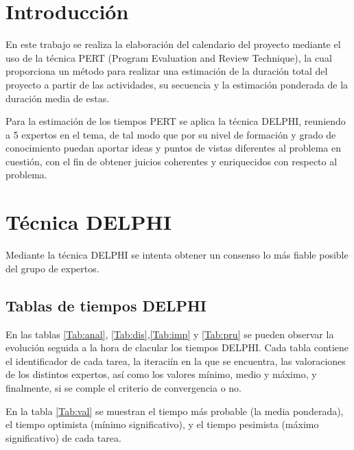\documentclass[11pt,a4paper,spanish,twoside]{report}
\begin{document}
\tableofcontents


\chapter*{Introducción}
En este trabajo se realiza la elaboración del calendario del proyecto
mediante el uso de la técnica PERT (Program Evaluation and Review Technique),
la cual proporciona un método para realizar una estimación de la duración
total del proyecto a partir de las actividades, su secuencia y la estimación
ponderada de la duración media de estas. 

Para la estimación de los tiempos PERT se aplica la técnica DELPHI, reuniendo
a 5 expertos en el tema, de tal modo que por su nivel de formación y grado de
conocimiento puedan aportar ideas y puntos de vistas diferentes al problema
en cuestión, con el fin de obtener juicios coherentes y enriquecidos con
respecto al problema. 
\chapter{Técnica DELPHI}
Mediante la técnica DELPHI se intenta obtener un consenso lo más fiable
posible del grupo de expertos.
\section{Tablas de tiempos DELPHI}
En las tablas \ref{Tab:anal}, \ref{Tab:dis},\ref{Tab:imp} y \ref{Tab:pru}  se
pueden observar la evolución seguida a la hora de clacular los tiempos
DELPHI. Cada tabla contiene el identificador de cada tarea, la iteraciín en
la que se encuentra, las valoraciones de los distintos expertos, así como los
valores mínimo, medio y máximo, y finalmente, si se comple el criterio de
convergencia o no.

En la tabla \ref{Tab:val} se muestran el tiempo más probable (la media
ponderada), el tiempo optimista (mínimo significativo), y el tiempo pesimista
(máximo significativo) de cada tarea.
\end{document}
